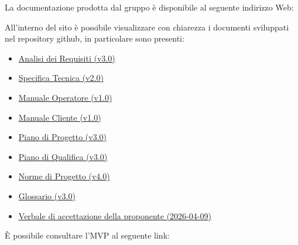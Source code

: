 \documentclass[a4paper, 11pt, oneside]{scrartcl} %
\begin{document}
La documentazione prodotta dal gruppo è disponibile al seguente indirizzo Web:

\begin{center}

\end{center}

All'interno del sito è possibile visualizzare con chiarezza i documenti sviluppati nel repository github, in particolare sono presenti:
\begin{itemize}
    \item \href{https://swenightpro.github.io/Documentazione/docs/PB/Documentazione\%20Esterna/Analisi_Dei_Requisiti.pdf}{Analisi dei Requisiti (v3.0)}
    \item \href{https://swenightpro.github.io/Documentazione/docs/PB/Documentazione\%20Esterna/Specifica_Tecnica.pdf}{Specifica Tecnica (v2.0)}
    \item \href{https://swenightpro.github.io/Documentazione/docs/PB/Documentazione\%20Esterna/Manuale_Operatore.pdf}{Manuale Operatore (v1.0)}
    \item \href{https://swenightpro.github.io/Documentazione/docs/PB/Documentazione\%20Esterna/Manuale_Cliente.pdf}{Manuale Cliente (v1.0)}
    \item \href{https://swenightpro.github.io/Documentazione/docs/PB/Documentazione\%20Esterna/Piano_Di_Progetto.pdf}{Piano di Progetto (v3.0)}
    \item \href{https://swenightpro.github.io/Documentazione/docs/PB/Documentazione\%20Esterna/Piano_Di_Qualifica.pdf}{Piano di Qualifica (v3.0)}
    \item \href{https://swenightpro.github.io/Documentazione/docs/PB/Documentazione\%20Interna/Norme_Di_Progetto.pdf}{Norme di Progetto (v4.0)}
    \item \href{https://swenightpro.github.io/Documentazione/docs/PB/Documentazione\%20Esterna/Glossario.pdf}{Glossario (v3.0)}
    \item \href{https://swenightpro.github.io/Documentazione/docs/PB/Documentazione%20Esterna/Verbali%20Esterni/Verbale_accettazione_2026-04-09_firmato.pdf}{Verbale di accettazione della proponente (2026-04-09)}
\end{itemize}

È possibile consultare l'MVP al seguente link:

    \begin{center}

\end{center}
\end{document}
